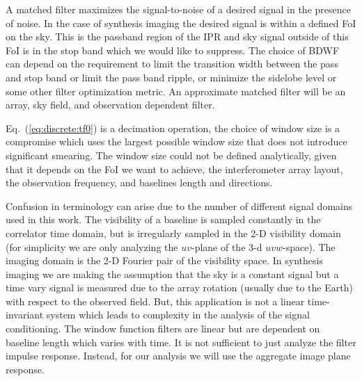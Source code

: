 \documentclass[useAMS,usenatbib]{mn2e}
\newcommand{\ATM}[1]{\textcolor{blue}{{\bf Marcellin: #1}}}
\newcommand{\GSF}[1]{\textcolor{red}{{\bf GSF: #1}}}
\begin{document}
A matched filter maximizes the signal-to-noise of a desired signal in the
presence of noise. In the case of synthesis imaging the desired signal is within
a defined FoI on the sky. This is the passband region of the IPR and 
sky signal outside of this FoI is in the stop band which we would like
to suppress. The choice of BDWF can depend on the requirement to limit the
transition width between the pass and stop band or limit the pass band ripple,
or minimize the sidelobe level or some other filter optimization metric. An
approximate matched filter will be an array, sky field, and observation
dependent filter.

Eq.~(\ref{eq:discrete:tf0}) is a decimation operation, the choice of window
size is a compromise which uses the largest possible window size that does not
introduce significant smearing. The window size  could not be defined analytically,
given that it depends on the FoI we want to achieve, the interferometer array layout, the observation frequency,
and baselines length and directions.

% 

Confusion in terminology can arise due to the number of different signal domains
used in this work. The visibility of a baseline is sampled constantly in the 
correlator time domain, but is irregularly sampled in the 2-D visibility domain
(for simplicity we are only analyzing the $uv$-plane of the 3-d $uvw$-space). The
imaging domain is the 2-D Fourier pair of the visibility space.
In synthesis imaging we are making the assumption that the sky is a constant
signal but a time vary signal is measured due to the array rotation (usually
due to the Earth) with respect to the observed field.
But, this application is not a linear time-invariant system which leads to complexity
in the analysis of the signal conditioning. The window function filters are
linear but are dependent on baseline length which varies with time. It is not
sufficient to just analyze the filter impulse response. Instead, for our
analysis we will use the aggregate image plane response.
\end{document}
